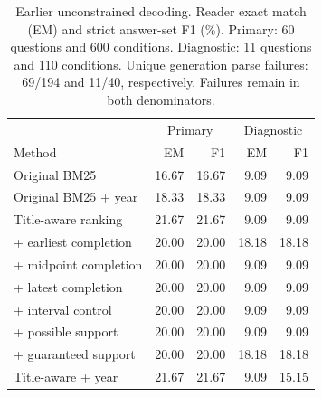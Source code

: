 \begin{table}[t]
\centering\footnotesize
\setlength{\tabcolsep}{3pt}
\begin{tabular}{@{}lrrrr@{}}
\toprule
 & \multicolumn{2}{c}{Primary} & \multicolumn{2}{c}{Diagnostic}\\
Method & EM & F1 & EM & F1\\
\midrule
Original BM25 & 16.67 & 16.67 & 9.09 & 9.09\\
Original BM25 + year & 18.33 & 18.33 & 9.09 & 9.09\\
Title-aware ranking & 21.67 & 21.67 & 9.09 & 9.09\\
\quad + earliest completion & 20.00 & 20.00 & 18.18 & 18.18\\
\quad + midpoint completion & 20.00 & 20.00 & 9.09 & 9.09\\
\quad + latest completion & 20.00 & 20.00 & 9.09 & 9.09\\
\quad + interval control & 20.00 & 20.00 & 9.09 & 9.09\\
\quad + possible support & 20.00 & 20.00 & 9.09 & 9.09\\
\quad + guaranteed support & 20.00 & 20.00 & 18.18 & 18.18\\
Title-aware + year & 21.67 & 21.67 & 9.09 & 15.15\\
\bottomrule
\end{tabular}
\caption{Earlier unconstrained decoding. Reader exact match (EM) and strict answer-set F1 (\%). Primary: 60 questions and 600 conditions. Diagnostic: 11 questions and 110 conditions. Unique generation parse failures: 69/194 and 11/40, respectively. Failures remain in both denominators.}
\label{tab:reader}
\end{table}
